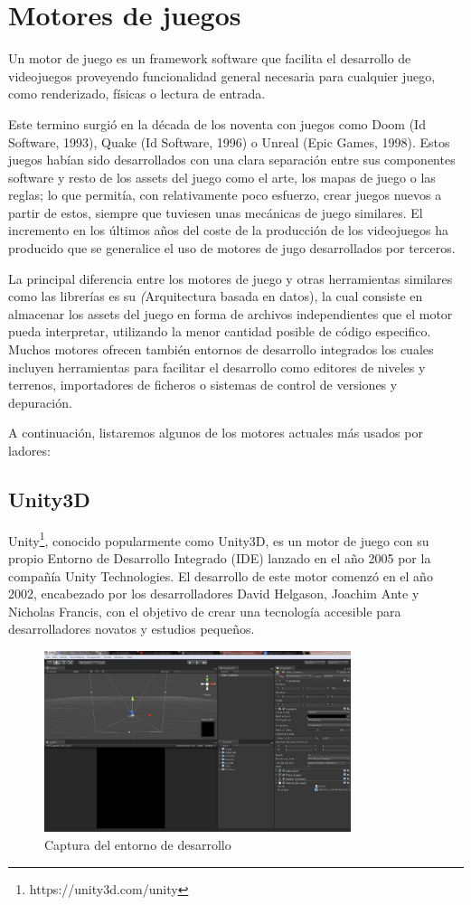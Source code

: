\section{Motores de juegos}
Un motor de juego es un framework software que facilita el desarrollo de videojuegos proveyendo  funcionalidad general necesaria para cualquier juego, como renderizado, físicas o lectura de entrada\cite{game_engine}.

Este termino surgió en la década de los noventa con juegos como Doom (Id Software, 1993), Quake (Id Software, 1996) o Unreal (Epic Games, 1998). Estos juegos habían sido desarrollados con una clara separación entre sus componentes software y resto de los assets del juego como el arte, los mapas de juego o las reglas; lo que permitía, con relativamente poco esfuerzo, crear juegos nuevos a partir de estos, siempre que tuviesen unas mecánicas de juego similares. El incremento en los últimos años del coste de la producción de los videojuegos ha producido que se generalice el uso de motores de jugo desarrollados por terceros. 

La principal diferencia entre los motores de juego y otras herramientas similares como las librerías es su \textit(Arquitectura basada en datos), la cual consiste en almacenar los assets del juego en forma de archivos independientes que el motor pueda interpretar, utilizando la menor cantidad posible de código especifico. Muchos motores ofrecen también entornos de desarrollo integrados los cuales incluyen herramientas para facilitar el desarrollo como editores de niveles y terrenos, importadores de ficheros o sistemas de control de versiones y depuración.

A continuación, listaremos algunos de los motores actuales más usados por ladores:

\subsection{Unity3D}
Unity\footnote{https://unity3d.com/unity}, conocido popularmente como Unity3D, es un motor de juego con su propio Entorno de Desarrollo Integrado (IDE) lanzado en el año 2005 por la compañía Unity Technologies. El desarrollo de este motor comenzó en el año 2002, encabezado por los desarrolladores David Helgason, Joachim Ante y Nicholas Francis, con el objetivo de crear una tecnología accesible para desarrolladores novatos y estudios pequeños.
\begin{figure}[h]
	\includegraphics[width=0.8\textwidth]{images/estadodelarte/motores/captura-unity}
	\centering
	\caption{Captura del entorno de desarrollo}
\end{figure}

